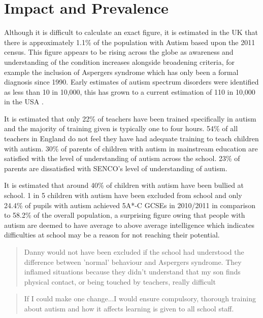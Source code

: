 \documentclass[11pt]{report}
\begin{document}
\section{Impact and Prevalence}
Although it is difficult to calculate an exact figure, it is estimated in the UK that there is approximately 1.1\% of the 
population with Autism based upon the 2011 census\cite{nas}. This figure appears to be rising across the globe as awareness and understanding of the condition increases alongside broadening criteria\cite{increasingprevalence}, for example the inclusion of Aspergers syndrome which has only been a formal diagnosis since 1990. Early estimates of autism spectrum disorders were identified as less than 10 in 10,000, this has grown to a current estimation of 110 in 10,000 in the USA \cite{increasingprevalence}.

It is estimated that only 22\% of teachers have been trained specifically in autism and the majority of training given is typically one to four hours. 54\% of all teachers in England do not feel they have had adequate training to teach children with autism.\cite{statsandfacts} 30\% of parents of children with autism in mainstream education are satisfied with the level of understanding of autism across the school\cite{nasschool}. 23\% of parents are dissatisfied with SENCO's level of understanding of autism. 

It is estimated that around 40\% of children with autism have been bullied at school. 1 in 5 children with autism have been excluded from school \cite{nasschool} and only 24.4\% of pupils with autism achieved 5A*-C GCSEs in 2010/2011 in comparison to 58.2\% of the overall population\cite{statsandfacts}, a surprising figure owing that people with autism are deemed to have average to above average intelligence which indicates difficulties at school may be a reason for not reaching their potential.

\begin{quote}
Danny would not have been excluded if the school had understood the difference between 'normal' behaviour and Aspergers syndrome. They inflamed situations because they didn't understand that my son finds physical contact, or being touched by teachers, really difficult \cite{nasschool}
\end{quote}

\begin{quote}
If I could make one change...I would ensure compulsory, thorough training about autism and how it affects learning is given to all school staff. \cite{nasschool}
\end{quote}
\end{document}
